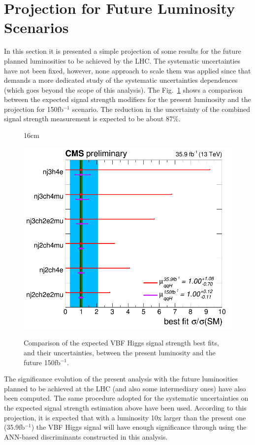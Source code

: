 \section{Projection for Future Luminosity Scenarios}
In this section it is presented a simple projection of some results for the future planned luminosities to be achieved by the LHC. The systematic uncertainties have not been fixed, however, none approach to scale them was applied since that demands a more dedicated study of the systematic uncertainties dependences (which goes beyond the scope of this analysis). The Fig.~\ref{fig:vbf_signal_strengths_150fb} shows a comparison between the expected signal strength modifiers for the present luminosity and the projection for 150fb$^{-1}$ scenario. The reduction in the uncertainty of the combined signal strength measurement is expected to be about 87$\%$.

\begin{figure}[hbtp]{16cm}
	\caption{Comparison of the expected VBF Higgs signal strength best fits, and their uncertainties, between the present luminosity and the future 150fb$^{-1}$.}	
	\centering
	\includegraphics[scale=0.3,trim={0.6cm 0cm 0.8cm 0cm},clip]{ChapterAnalysis/figs/ChannelsCompatibility_39fb_vs_150fb}
	\label{fig:vbf_signal_strengths_150fb}
\end{figure}

The significance evolution of the present analysis with the future luminosities planned to be achieved at the LHC (and also some intermediary ones) have also been computed. The same procedure adopted for the systematic uncertainties on the expected signal strength estimation above have been used. According to this projection, it is expected that with a luminosity 10x larger than the present one (35.9fb$^{-1}$) the VBF Higgs signal will have enough significance through using the ANN-based discriminants constructed in this analysis.

